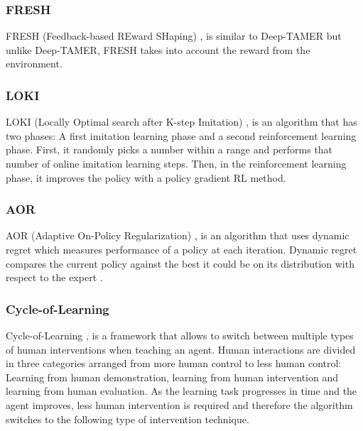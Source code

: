 \subsubsection*{FRESH}
FRESH (Feedback-based REward SHaping) \cite{FRESH-xiao:2020}, is similar to Deep-TAMER \cite{DeepTAMER-Warnell-et-al:2018} but unlike Deep-TAMER, FRESH takes into account the reward from the environment.



\subsubsection*{LOKI}
LOKI (Locally Optimal search after K-step Imitation) \cite{LOKI-Cheng:2018}, is an algorithm that has two phases: A first imitation learning phase and a second reinforcement learning phase. First, it randomly picks a number within a range and performs that number of online imitation learning steps. Then, in the reinforcement learning phase, it improves the policy with a policy gradient RL method.










\subsubsection*{AOR}
AOR (Adaptive On-Policy Regularization) \cite{AOR-lee-laskey:2019}, is an algorithm that uses dynamic regret which measures performance of a policy at each iteration. Dynamic regret compares the current  policy  against  the  best  it  could  be  on  its  distribution with  respect  to  the  expert \cite{Dynamic-regret-Laskey:2018}.  

















\subsubsection*{Cycle-of-Learning}
Cycle-of-Learning \cite{Cycle-of-Learning-waytowich:2018},  is a framework that allows to switch between multiple types of human interventions when teaching an agent. Human interactions are divided in three categories arranged from more human control to less human control: Learning from human demonstration, learning from human intervention and learning from human evaluation. As the learning task progresses in time and the agent improves, less human intervention is required and therefore the algorithm switches to the following type of intervention technique.


